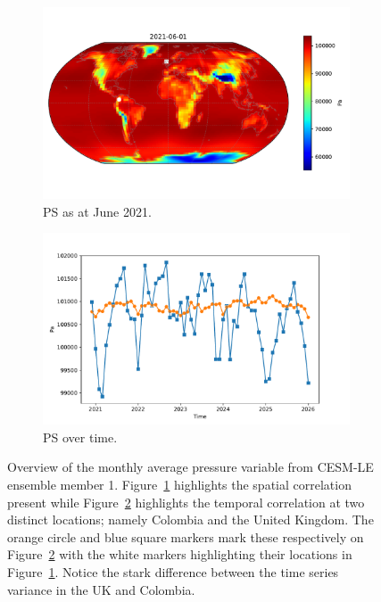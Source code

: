 \begin{figure}[htbp!] 
	\centering
	\begin{subfigure}[b]{0.45\textwidth}
		\includegraphics[width=\textwidth]{PS_example}
		\caption{PS as at June 2021.}
		\label{fig:pressure_june}   
	\end{subfigure}             
	\begin{subfigure}[b]{0.45\textwidth}
		\includegraphics[width=\textwidth]{PS_example_temp}
		\caption{PS  over time.}
		\label{fig:pressure_temp}
	\end{subfigure}             
	\caption[Overview of the Pressure variable from the CESM-LE dataset.]{Overview of the monthly average pressure variable from CESM-LE ensemble member 1. Figure~\ref{fig:pressure_june} highlights the spatial correlation present while Figure~\ref{fig:pressure_temp} highlights the temporal correlation at two distinct locations; namely Colombia and the United Kingdom. The orange circle and blue square markers mark these respectively on Figure~\ref{fig:pressure_temp} with the white markers highlighting their locations in Figure~\ref{fig:pressure_june}. Notice the stark difference between the time series variance in the UK and Colombia.}
	\label{fig:pressure_overview}
\end{figure}

